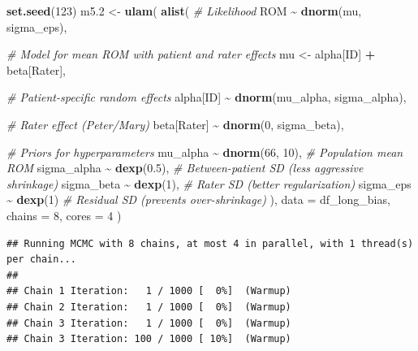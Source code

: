 \documentclass[
]{book}
\newenvironment{Shaded}{\begin{snugshade}}{\end{snugshade}}
\newcommand{\AttributeTok}[1]{\textcolor[rgb]{0.13,0.29,0.53}{#1}}
\newcommand{\CommentTok}[1]{\textcolor[rgb]{0.56,0.35,0.01}{\textit{#1}}}
\newcommand{\DecValTok}[1]{\textcolor[rgb]{0.00,0.00,0.81}{#1}}
\newcommand{\FloatTok}[1]{\textcolor[rgb]{0.00,0.00,0.81}{#1}}
\newcommand{\FunctionTok}[1]{\textcolor[rgb]{0.13,0.29,0.53}{\textbf{#1}}}
\newcommand{\NormalTok}[1]{#1}
\newcommand{\OtherTok}[1]{\textcolor[rgb]{0.56,0.35,0.01}{#1}}
\newcommand{\SpecialCharTok}[1]{\textcolor[rgb]{0.81,0.36,0.00}{\textbf{#1}}}
\begin{document}
\begin{Shaded}
\begin{Highlighting}[]
\FunctionTok{set.seed}\NormalTok{(}\DecValTok{123}\NormalTok{)}
\NormalTok{m5}\FloatTok{.2} \OtherTok{\textless{}{-}} \FunctionTok{ulam}\NormalTok{(}
  \FunctionTok{alist}\NormalTok{(}
    \CommentTok{\# Likelihood}
\NormalTok{    ROM }\SpecialCharTok{\textasciitilde{}} \FunctionTok{dnorm}\NormalTok{(mu, sigma\_eps),}
    
    \CommentTok{\# Model for mean ROM with patient and rater effects}
\NormalTok{    mu }\OtherTok{\textless{}{-}}\NormalTok{ alpha[ID] }\SpecialCharTok{+}\NormalTok{ beta[Rater],}
    
    \CommentTok{\# Patient{-}specific random effects}
\NormalTok{    alpha[ID] }\SpecialCharTok{\textasciitilde{}} \FunctionTok{dnorm}\NormalTok{(mu\_alpha, sigma\_alpha),}
    
    \CommentTok{\# Rater effect (Peter/Mary)}
\NormalTok{    beta[Rater] }\SpecialCharTok{\textasciitilde{}} \FunctionTok{dnorm}\NormalTok{(}\DecValTok{0}\NormalTok{, sigma\_beta),}
    
    \CommentTok{\# Priors for hyperparameters}
\NormalTok{    mu\_alpha }\SpecialCharTok{\textasciitilde{}} \FunctionTok{dnorm}\NormalTok{(}\DecValTok{66}\NormalTok{, }\DecValTok{10}\NormalTok{),  }\CommentTok{\# Population mean ROM}
\NormalTok{    sigma\_alpha }\SpecialCharTok{\textasciitilde{}} \FunctionTok{dexp}\NormalTok{(}\FloatTok{0.5}\NormalTok{),  }\CommentTok{\# Between{-}patient SD (less aggressive shrinkage)}
\NormalTok{    sigma\_beta }\SpecialCharTok{\textasciitilde{}} \FunctionTok{dexp}\NormalTok{(}\DecValTok{1}\NormalTok{),   }\CommentTok{\# Rater SD (better regularization)}
\NormalTok{    sigma\_eps }\SpecialCharTok{\textasciitilde{}} \FunctionTok{dexp}\NormalTok{(}\DecValTok{1}\NormalTok{)     }\CommentTok{\# Residual SD (prevents over{-}shrinkage)}
\NormalTok{  ), }
  \AttributeTok{data =}\NormalTok{ df\_long\_bias, }
  \AttributeTok{chains =} \DecValTok{8}\NormalTok{, }\AttributeTok{cores =} \DecValTok{4}
\NormalTok{)}
\end{Highlighting}
\end{Shaded}

\begin{verbatim}
## Running MCMC with 8 chains, at most 4 in parallel, with 1 thread(s) per chain...
## 
## Chain 1 Iteration:   1 / 1000 [  0%]  (Warmup) 
## Chain 2 Iteration:   1 / 1000 [  0%]  (Warmup) 
## Chain 3 Iteration:   1 / 1000 [  0%]  (Warmup) 
## Chain 3 Iteration: 100 / 1000 [ 10%]  (Warmup)
\end{verbatim}
\end{document}
